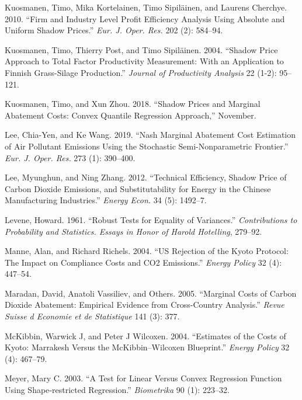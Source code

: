 \documentclass[
  12pt,
]{article}
\begin{document}
\leavevmode\hypertarget{ref-Kuosmanen2010}{}%
Kuosmanen, Timo, Mika Kortelainen, Timo Sipiläinen, and Laurens Cherchye. 2010. ``Firm and Industry Level Profit Efficiency Analysis Using Absolute and Uniform Shadow Prices.'' \emph{Eur. J. Oper. Res.} 202 (2): 584--94.

\leavevmode\hypertarget{ref-Kuosmanen2004}{}%
Kuosmanen, Timo, Thierry Post, and Timo Sipiläinen. 2004. ``Shadow Price Approach to Total Factor Productivity Measurement: With an Application to Finnish Grass-Silage Production.'' \emph{Journal of Productivity Analysis} 22 (1-2): 95--121.

\leavevmode\hypertarget{ref-Kuosmanen2018b}{}%
Kuosmanen, Timo, and Xun Zhou. 2018. ``Shadow Prices and Marginal Abatement Costs: Convex Quantile Regression Approach,'' November.

\leavevmode\hypertarget{ref-Lee2019}{}%
Lee, Chia-Yen, and Ke Wang. 2019. ``Nash Marginal Abatement Cost Estimation of Air Pollutant Emissions Using the Stochastic Semi-Nonparametric Frontier.'' \emph{Eur. J. Oper. Res.} 273 (1): 390--400.

\leavevmode\hypertarget{ref-Lee2012}{}%
Lee, Myunghun, and Ning Zhang. 2012. ``Technical Efficiency, Shadow Price of Carbon Dioxide Emissions, and Substitutability for Energy in the Chinese Manufacturing Industries.'' \emph{Energy Econ.} 34 (5): 1492--7.

\leavevmode\hypertarget{ref-Levene1961}{}%
Levene, Howard. 1961. ``Robust Tests for Equality of Variances.'' \emph{Contributions to Probability and Statistics. Essays in Honor of Harold Hotelling}, 279--92.

\leavevmode\hypertarget{ref-Manne2004}{}%
Manne, Alan, and Richard Richels. 2004. ``US Rejection of the Kyoto Protocol: The Impact on Compliance Costs and CO2 Emissions.'' \emph{Energy Policy} 32 (4): 447--54.

\leavevmode\hypertarget{ref-Maradan2005}{}%
Maradan, David, Anatoli Vassiliev, and Others. 2005. ``Marginal Costs of Carbon Dioxide Abatement: Empirical Evidence from Cross-Country Analysis.'' \emph{Revue Suisse d Economie et de Statistique} 141 (3): 377.

\leavevmode\hypertarget{ref-McKibbin2004}{}%
McKibbin, Warwick J, and Peter J Wilcoxen. 2004. ``Estimates of the Costs of Kyoto: Marrakesh Versus the McKibbin--Wilcoxen Blueprint.'' \emph{Energy Policy} 32 (4): 467--79.

\leavevmode\hypertarget{ref-Meyer2003}{}%
Meyer, Mary C. 2003. ``A Test for Linear Versus Convex Regression Function Using Shape‐restricted Regression.'' \emph{Biometrika} 90 (1): 223--32.
\end{document}
